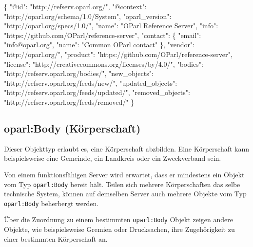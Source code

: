\documentclass[,a4paper]{article}
\newenvironment{Shaded}{}{}
\newcommand{\DataTypeTok}[1]{\textcolor[rgb]{0.56,0.13,0.00}{{#1}}}
\newcommand{\StringTok}[1]{\textcolor[rgb]{0.25,0.44,0.63}{{#1}}}
\newcommand{\NormalTok}[1]{{#1}}
\begin{document}
\begin{Shaded}
\begin{Highlighting}[]
\NormalTok{\{}
    \DataTypeTok{"@id"}\NormalTok{: }\StringTok{"http://refserv.oparl.org/"}\NormalTok{,}
    \DataTypeTok{"@context"}\NormalTok{: }\StringTok{"http://oparl.org/schema/1.0/System"}\NormalTok{,}
    \DataTypeTok{"oparl_version"}\NormalTok{: }\StringTok{"http://oparl.org/specs/1.0/"}\NormalTok{,}
    \DataTypeTok{"name"}\NormalTok{: }\StringTok{"OParl Reference Server"}\NormalTok{,}
    \DataTypeTok{"info"}\NormalTok{: }\StringTok{"https://github.com/OParl/reference-server"}\NormalTok{,}
    \DataTypeTok{"contact"}\NormalTok{: \{}
        \DataTypeTok{"email"}\NormalTok{: }\StringTok{"info@oparl.org"}\NormalTok{,}
        \DataTypeTok{"name"}\NormalTok{: }\StringTok{"Common OParl contact"}
    \NormalTok{\}, }
    \DataTypeTok{"vendor"}\NormalTok{: }\StringTok{"http://oparl.org/"}\NormalTok{,}
    \DataTypeTok{"product"}\NormalTok{: }\StringTok{"https://github.com/OParl/reference-server"}\NormalTok{,}
    \DataTypeTok{"license"}\NormalTok{: }\StringTok{"http://creativecommons.org/licenses/by/4.0/"}\NormalTok{,}
    \DataTypeTok{"bodies"}\NormalTok{: }\StringTok{"http://refserv.oparl.org/bodies/"}\NormalTok{,}
    \DataTypeTok{"new_objects"}\NormalTok{: }\StringTok{"http://refserv.oparl.org/feeds/new/"}\NormalTok{,}
    \DataTypeTok{"updated_objects"}\NormalTok{: }\StringTok{"http://refserv.oparl.org/feeds/updated/"}\NormalTok{,}
    \DataTypeTok{"removed_objects"}\NormalTok{: }\StringTok{"http://refserv.oparl.org/feeds/removed/"}
\NormalTok{\}}
\end{Highlighting}
\end{Shaded}

\subsection{oparl:Body (Körperschaft)}

Dieser Objekttyp erlaubt es, eine Körperschaft abzbilden. Eine
Körperschaft kann beispielsweise eine Gemeinde, ein Landkreis oder ein
Zweckverband sein.

Von einem funktionsfähigen Server wird erwartet, dass er mindestens ein
Objekt vom Typ \texttt{oparl:Body} bereit hält. Teilen sich mehrere
Körperschaften das selbe technische System, können auf demselben Server
auch mehrere Objekte vom Typ \texttt{oparl:Body} beherbergt werden.

Über die Zuordnung zu einem bestimmten \texttt{oparl:Body} Objekt zeigen
andere Objekte, wie beispielsweise Gremien oder Drucksachen, ihre
Zugehörigkeit zu einer bestimmten Körperschaft an.
\end{document}
